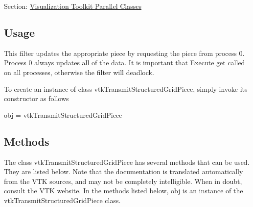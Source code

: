 Section\-: \hyperlink{sec_vtkparallel}{Visualization Toolkit Parallel Classes} \hypertarget{vtkwidgets_vtkxyplotwidget_Usage}{}\subsection{Usage}\label{vtkwidgets_vtkxyplotwidget_Usage}
This filter updates the appropriate piece by requesting the piece from process 0. Process 0 always updates all of the data. It is important that Execute get called on all processes, otherwise the filter will deadlock.

To create an instance of class vtk\-Transmit\-Structured\-Grid\-Piece, simply invoke its constructor as follows \begin{DoxyVerb}  obj = vtkTransmitStructuredGridPiece
\end{DoxyVerb}
 \hypertarget{vtkwidgets_vtkxyplotwidget_Methods}{}\subsection{Methods}\label{vtkwidgets_vtkxyplotwidget_Methods}
The class vtk\-Transmit\-Structured\-Grid\-Piece has several methods that can be used. They are listed below. Note that the documentation is translated automatically from the V\-T\-K sources, and may not be completely intelligible. When in doubt, consult the V\-T\-K website. In the methods listed below, {\ttfamily obj} is an instance of the vtk\-Transmit\-Structured\-Grid\-Piece class. 
